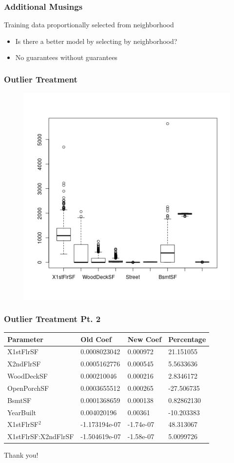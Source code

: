 \documentclass{beamer}
\begin{document}
\begin{frame}
  \frametitle{Additional Musings}
  Training data proportionally selected from neighborhood
\begin{itemize}
\item Is there a better model by selecting by neighborhood?
\item No guarantees without guarantees
\end{itemize}
\end{frame}

  \begin{frame}
\frametitle{Outlier Treatment}
\begin{figure}
\includegraphics[width=0.75\linewidth,keepaspectratio=true]{img/outlierboxplot.png}
\end{figure}
\end{frame}


 \begin{frame}
 \frametitle{Outlier Treatment Pt. 2}
 \begin{table}
 \begin{tabular}{l l l l}
 \toprule
 \textbf{Parameter} & \textbf{Old Coef} & \textbf{New Coef} & \textbf{Percentage}\\
 \midrule
 X1stFlrSF           &  0.0008023042 &         0.000972 &  21.151055 \\
 X2ndFlrSF           &  0.0005162776 &         0.000545 &  5.5633636 \\
 WoodDeckSF          &   0.000210046 &         0.000216 &  2.8346172 \\
 OpenPorchSF         &  0.0003655512 &         0.000265 & -27.506735 \\
 BsmtSF              &  0.0001368659 &         0.000138 & 0.82862130 \\
 YearBuilt           &   0.004020196 &          0.00361 & -10.203383 \\
 X1stFlrSF$^2$         & -1.173194e-07 &        -1.74e-07 &  48.313067 \\
 X1stFlrSF:X2ndFlrSF & -1.504619e-07 &        -1.58e-07 &  5.0099726 \\
 \bottomrule
 \end{tabular}
  \end{table}
 \end{frame}




\begin{frame}
\Huge{\centerline{Thank you!}}
\end{frame}
\end{document}

